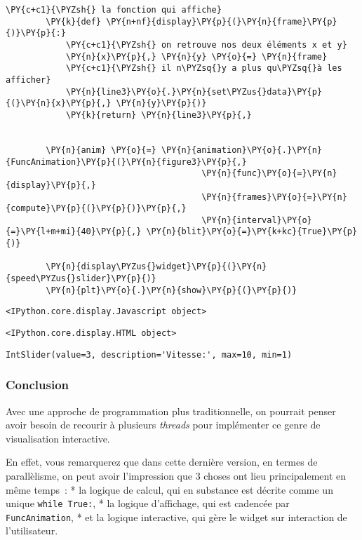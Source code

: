 \begin{Verbatim}[commandchars=\\\{\}]
        \PY{c+c1}{\PYZsh{} la fonction qui affiche}
        \PY{k}{def} \PY{n+nf}{display}\PY{p}{(}\PY{n}{frame}\PY{p}{)}\PY{p}{:}
            \PY{c+c1}{\PYZsh{} on retrouve nos deux éléments x et y}
            \PY{n}{x}\PY{p}{,} \PY{n}{y} \PY{o}{=} \PY{n}{frame}
            \PY{c+c1}{\PYZsh{} il n\PYZsq{}y a plus qu\PYZsq{}à les afficher}
            \PY{n}{line3}\PY{o}{.}\PY{n}{set\PYZus{}data}\PY{p}{(}\PY{n}{x}\PY{p}{,} \PY{n}{y}\PY{p}{)}
            \PY{k}{return} \PY{n}{line3}\PY{p}{,}
        
        
        \PY{n}{anim} \PY{o}{=} \PY{n}{animation}\PY{o}{.}\PY{n}{FuncAnimation}\PY{p}{(}\PY{n}{figure3}\PY{p}{,}
                                       \PY{n}{func}\PY{o}{=}\PY{n}{display}\PY{p}{,}
                                       \PY{n}{frames}\PY{o}{=}\PY{n}{compute}\PY{p}{(}\PY{p}{)}\PY{p}{,}
                                       \PY{n}{interval}\PY{o}{=}\PY{l+m+mi}{40}\PY{p}{,} \PY{n}{blit}\PY{o}{=}\PY{k+kc}{True}\PY{p}{)}
        
        \PY{n}{display\PYZus{}widget}\PY{p}{(}\PY{n}{speed\PYZus{}slider}\PY{p}{)}
        \PY{n}{plt}\PY{o}{.}\PY{n}{show}\PY{p}{(}\PY{p}{)}
\end{Verbatim}


    
    \begin{verbatim}
<IPython.core.display.Javascript object>
    \end{verbatim}

    
    
    \begin{verbatim}
<IPython.core.display.HTML object>
    \end{verbatim}

    
    
    \begin{verbatim}
IntSlider(value=3, description='Vitesse:', max=10, min=1)
    \end{verbatim}

    
    \hypertarget{conclusion}{%
\subsubsection{Conclusion}\label{conclusion}}

    Avec une approche de programmation plus traditionnelle, on pourrait
penser avoir besoin de recourir à plusieurs \emph{threads} pour
implémenter ce genre de visualisation interactive.

En effet, vous remarquerez que dans cette dernière version, en termes de
parallèlisme, on peut avoir l'impression que 3 choses ont lieu
principalement en même temps~: * la logique de calcul, qui en substance
est décrite comme un unique \texttt{while\ True:}, * la logique
d'affichage, qui est cadencée par \texttt{FuncAnimation}, * et la
logique interactive, qui gère le widget sur interaction de
l'utilisateur.

